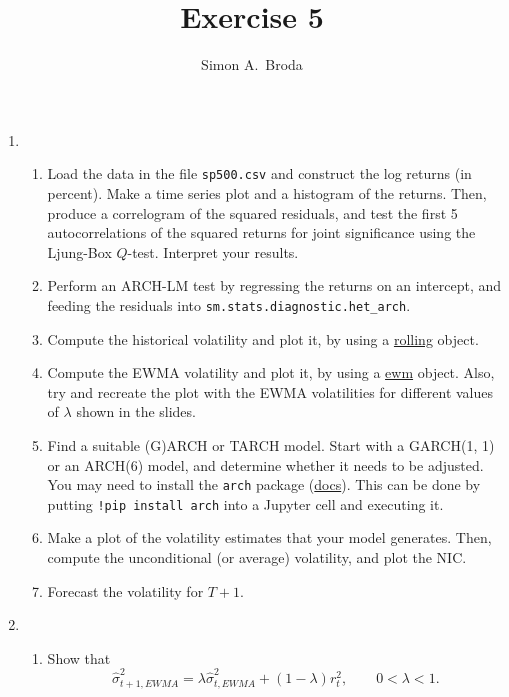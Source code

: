 \documentclass[11pt, a4paper]{article}
\begin{document}
\title{Exercise 5}
\author{Simon A.\ Broda}
\date{}
\maketitle

\begin{enumerate}

\item
\begin{enumerate}
\item Load the data in the file \texttt{sp500.csv} and construct the log returns (in percent). Make a time series plot and a histogram of the returns. Then, produce a correlogram of the squared residuals, and test the first 5 autocorrelations of the squared returns for joint significance using the Ljung-Box $Q$-test. Interpret your results.
\item Perform an ARCH-LM test by regressing the returns on an intercept, and feeding the residuals into \verb+sm.stats.diagnostic.het_arch+.
\item Compute the historical volatility and plot it, by using a \href{https://pandas.pydata.org/docs/reference/api/pandas.DataFrame.rolling.html}{rolling} object.
\item Compute the EWMA volatility and plot it, by using a  \href{https://pandas.pydata.org/docs/reference/api/pandas.DataFrame.ewm.html}{ewm} object. Also, try and recreate the plot with the EWMA volatilities for different values of $\lambda$ shown in the slides.
\item Find a suitable (G)ARCH or TARCH model. Start with a GARCH(1, 1) or an ARCH(6) model, and determine whether it needs to be adjusted. You may need to install the \texttt{arch} package (\href{https://arch.readthedocs.io/en/latest/univariate/introduction.html}{docs}). This can be done by putting \texttt{!pip install arch} into a Jupyter cell and executing it.
\item Make a plot of the volatility estimates that your model generates. Then, compute the unconditional (or average) volatility, and plot the NIC.
\item Forecast the volatility for $T+1$.
\end{enumerate}
\item
\begin{enumerate}
\item Show that
\[
\widehat{\sigma}_{t+1,EWMA}^{2} =\lambda\widehat{\sigma}_{t,EWMA}^{2}+(1-\lambda )r_{t}^{2},\qquad 0<\lambda <1.
\]
\end{enumerate}
\end{enumerate}
\end{document}
